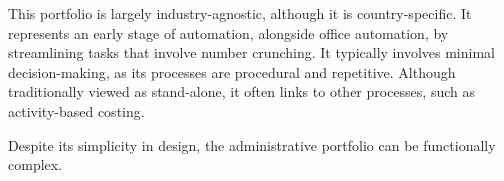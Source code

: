 This portfolio is largely industry-agnostic, although it is country-specific. 
It represents an early stage of automation, alongside office automation, by streamlining tasks that involve number crunching. 
It typically involves minimal decision-making, as its processes are procedural and repetitive. 
Although traditionally viewed as stand-alone, it often links to other processes, such as activity-based costing.

Despite its simplicity in design, the administrative portfolio can be functionally complex.
